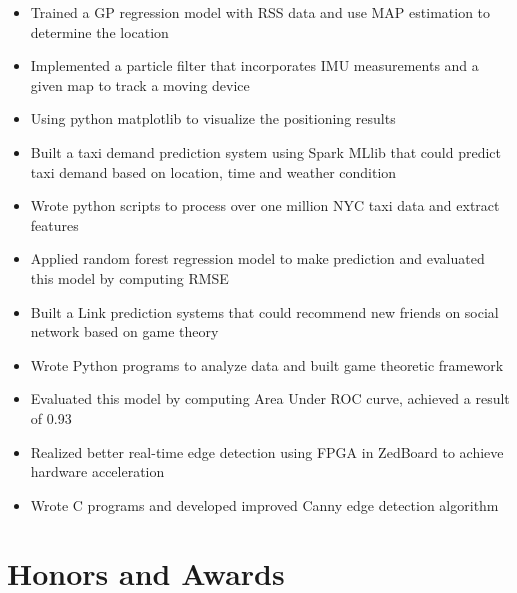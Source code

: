 \documentclass{resume}
\begin{document}

\begin{itemize}
  \item Trained a GP regression model with RSS data and use MAP estimation to determine the location
  \item  Implemented a particle filter that incorporates IMU measurements and a given map to track a moving device
  \item Using python matplotlib to visualize the positioning results
\end{itemize}


\begin{itemize}
  \item Built a taxi demand prediction system using Spark MLlib that could predict taxi demand based on location, time and weather condition
  \item Wrote python scripts to process over one million NYC taxi data and extract features
  \item Applied random forest regression model to make prediction and evaluated this model by computing RMSE
\end{itemize}

\begin{itemize}
    \item Built a Link prediction systems that could recommend new friends on social network based on game theory
    \item Wrote Python programs to analyze data and built game theoretic framework
    \item Evaluated this model by computing Area Under ROC curve, achieved a result of 0.93
\end{itemize}

\begin{itemize}
    \item Realized better real-time edge detection using FPGA in ZedBoard to achieve hardware acceleration
    \item Wrote C programs and developed improved  Canny edge detection algorithm
\end{itemize}

\section{Honors and Awards}








%
%
\end{document}
